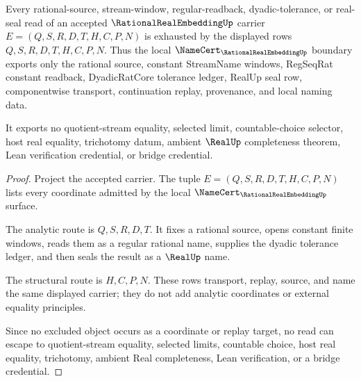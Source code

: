\begin{theorem}
\label{thm:rational-real-embedding-nonescape}
Every rational-source, stream-window, regular-readback, dyadic-tolerance, or real-seal read of an accepted $\RationalRealEmbeddingUp$ carrier $E=(Q,S,R,D,T,H,C,P,N)$ is exhausted by the displayed rows $Q,S,R,D,T,H,C,P,N$. Thus the local $\NameCert_{\RationalRealEmbeddingUp}$ boundary exports only the rational source, constant StreamName windows, RegSeqRat constant readback, DyadicRatCore tolerance ledger, RealUp seal row, componentwise transport, continuation replay, provenance, and local naming data.

It exports no quotient-stream equality, selected limit, countable-choice selector, host real equality, trichotomy datum, ambient $\RealUp$ completeness theorem, Lean verification credential, or bridge credential.
\end{theorem}
\begin{proof}
Project the accepted carrier. The tuple $E=(Q,S,R,D,T,H,C,P,N)$ lists every coordinate admitted by the local $\NameCert_{\RationalRealEmbeddingUp}$ surface.

The analytic route is $Q,S,R,D,T$. It fixes a rational source, opens constant finite windows, reads them as a regular rational name, supplies the dyadic tolerance ledger, and then seals the result as a $\RealUp$ name.

The structural route is $H,C,P,N$. These rows transport, replay, source, and name the same displayed carrier; they do not add analytic coordinates or external equality principles.

Since no excluded object occurs as a coordinate or replay target, no read can escape to quotient-stream equality, selected limits, countable choice, host real equality, trichotomy, ambient Real completeness, Lean verification, or a bridge credential.
\end{proof}


